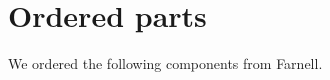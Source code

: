 \chapter{Ordered parts}\label{app:ordered-parts}
We ordered the following components from Farnell.


